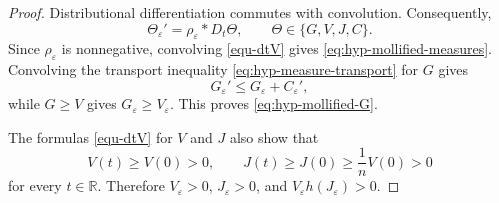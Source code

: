 \documentclass[11pt,reqno]{amsart}
\numberwithin{equation}{section}
\theoremstyle{definition}
\begin{document}
\begin{proof}
Distributional differentiation commutes with convolution. Consequently,
\begin{equation*}
    \Theta_\varepsilon'=\rho_\varepsilon*D_t\Theta,
    \qquad \Theta\in\{G,V,J,C\}.
\end{equation*}
Since $\rho_\varepsilon$ is nonnegative, convolving
\eqref{equ-dtV} gives \eqref{eq:hyp-mollified-measures}. Convolving the transport inequality \eqref{eq:hyp-measure-transport} for $G$ gives
\begin{equation*}
    G_\varepsilon'\leq G_\varepsilon+C_\varepsilon',
\end{equation*}
while $G\geq V$ gives $G_\varepsilon\geq V_\varepsilon$. This proves
\eqref{eq:hyp-mollified-G}.

The formulas \eqref{equ-dtV} for $V$ and $J$ also show that
\begin{equation*}
    V(t)\geq V(0)>0,
    \qquad
    J(t)\geq J(0)\geq\frac1nV(0)>0
\end{equation*}
for every $t\in\mathbb R$. Therefore
$V_\varepsilon>0$, $J_\varepsilon>0$, and
$V_\varepsilon h(J_\varepsilon)>0$.


\end{proof}
\end{document}
